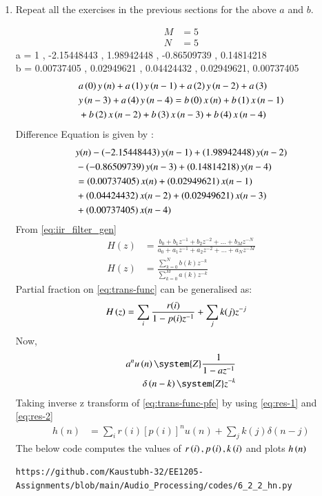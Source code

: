 \documentclass[journal,12pt,twocolumn]{IEEEtran}
\theoremstyle{remark}
\begin{document}
\begin{enumerate}[label=\thesection.\arabic*]
\item Repeat all the exercises in the previous sections for the above $a$ and $b$.

\solution
\begin{align}
    M &= 5\\
    N&=5
\end{align}
a = 1 , -2.15448443 , 1.98942448 , -0.86509739 , 0.14814218\\


b = 0.00737405 , 0.02949621 , 0.04424432 , 0.02949621, 0.00737405\\


\begin{align}
    &a\left(0\right)y\left(n\right) + a\left(1\right)y\left(n-1\right)+a\left(2\right)y\left(n-2\right)+a\left(3\right)\\ \notag &y\left(n-3\right) + a\left(4\right)y\left(n-4\right) =   b\left(0\right)x\left(n\right) + b\left(1\right)x\left(n-1\right)\\ \notag &+b\left(2\right)x\left(n-2\right)+b\left(3\right)x\left(n-3\right) + b\left(4\right)x\left(n-4\right) 
\end{align}
Difference Equation is given by :
\begin{align}
	&y(n) - \left(-2.15448443\right)y(n - 1) + \left(1.98942448\right)y(n - 2) \nonumber \\
	&- \left(-0.86509739\right)y(n - 3) + \left( 0.14814218\right)y(n - 4) \nonumber \\
	&= \left(0.00737405\right)x(n) + \left( 0.02949621\right)x(n - 1) \nonumber \\
	&+ \left(0.04424432\right)x(n - 2) + \left( 0.02949621\right)x(n - 3) \nonumber \\
	&+ \left(0.00737405\right)x(n - 4)
\end{align}
From \eqref{eq:iir_filter_gen} 
\begin{align}
    H(z) &= \frac{b_0 + b_1 z^{-1} + b_2 z^{-2} + \ldots + b_M z^{-N}}{a_0 + a_1 z^{-1} + a_2 z^{-2} + \ldots + a_N z^{-M}}\\
    H(z) &= \frac{\sum_{k = 0}^{N}b(k)z^{-k}}{\sum_{k = 0}^{M}a(k)z^{-k}} \label{eq:trans-func}
\end{align}
Partial fraction on \eqref{eq:trans-func} can be generalised as:
\begin{align}
    H\left(z\right)&= \sum_{i}\frac{r(i)}{1 - p(i)z^{-1}} + \sum_{j}k(j)z^{-j}
	\label{eq:trans-func-pfe}
\end{align}
Now,
\begin{align}
    a^{n}u\brak{n} \system{Z} \frac{1}{1-az^{-1}} \label{eq:res-1}\\
    \delta\brak{n-k} \system{Z} z^{-k}\label{eq:res-2}
\end{align}
Taking inverse z transform of \eqref{eq:trans-func-pfe} by using \eqref{eq:res-1} and \eqref{eq:res-2}
\begin{align}
h(n) &= \sum_{i}r(i)[p(i)]^nu(n) + \sum_{j}k(j)\delta(n - j)
	\label{eq:h-n-expr}
\end{align}
The below code computes the values of $r\left(i\right),p\left(i\right) , k\left(i\right)$ and plots $h\left(n\right)$
\begin{lstlisting}
https://github.com/Kaustubh-32/EE1205-Assignments/blob/main/Audio_Processing/codes/6_2_2_hn.py
\end{lstlisting}
%


\end{enumerate}
\end{document}
